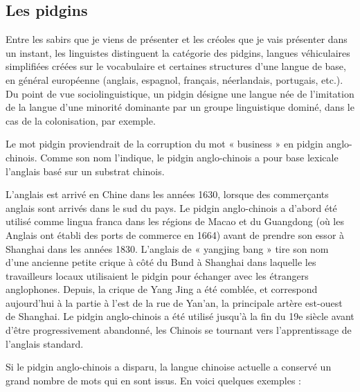 \subsection{Les pidgins}


Entre les sabirs que je viens de présenter et les créoles que je vais présenter dans un instant, les linguistes distinguent la catégorie des pidgins, langues véhiculaires simplifiées créées sur le vocabulaire et certaines structures d’une langue de base, en général européenne (anglais, espagnol, français, néerlandais, portugais, etc.). Du point de vue sociolinguistique, un pidgin désigne une langue née de l’imitation de la langue d’une minorité dominante par un groupe linguistique dominé, dans le cas de la colonisation, par exemple.



Le mot pidgin proviendrait de la corruption du mot « business » en pidgin anglo-chinois. Comme son nom l’indique, le pidgin anglo-chinois a pour base lexicale l’anglais basé sur un substrat chinois.



L’anglais est arrivé en Chine dans les années 1630, lorsque des commerçants anglais sont arrivés dans le sud du pays. Le pidgin anglo-chinois a d’abord été utilisé comme lingua franca dans les régions de Macao et du Guangdong (où les Anglais ont établi des ports de commerce en 1664) avant de prendre son essor à Shanghai dans les années 1830. L’anglais de « yangjing bang » tire son nom d’une ancienne petite crique à côté du Bund à Shanghai dans laquelle les travailleurs locaux utilisaient le pidgin pour échanger avec les étrangers anglophones. Depuis, la crique de Yang Jing a été comblée, et correspond aujourd’hui à la partie à l’est de la rue de Yan’an, la principale artère est-ouest de Shanghai. Le pidgin anglo-chinois a été utilisé jusqu’à la fin du 19e siècle avant d’être progressivement abandonné, les Chinois se tournant vers l’apprentissage de l’anglais standard.



Si le pidgin anglo-chinois a disparu, la langue chinoise actuelle a conservé un grand nombre de mots qui en sont issus. En voici quelques exemples :


